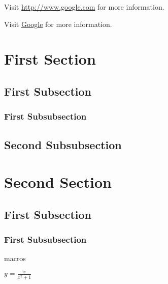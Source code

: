 \documentclass[10pt, letterpaper]{article}
\def\eq1{y=\frac{x}{x^2+1}} %
\begin{document}
Visit \url{http://www.google.com} for more information.

Visit \href{http://www.google.com}{Google} for more information.


\section{First Section}

\subsection{First Subsection}

\subsubsection{First Subsubsection}

\subsection{Second Subsubsection}

\section{Second Section}

\subsection{First Subsection}

\subsubsection*{First Subsubsection}


macros

$\eq1$
\end{document}
